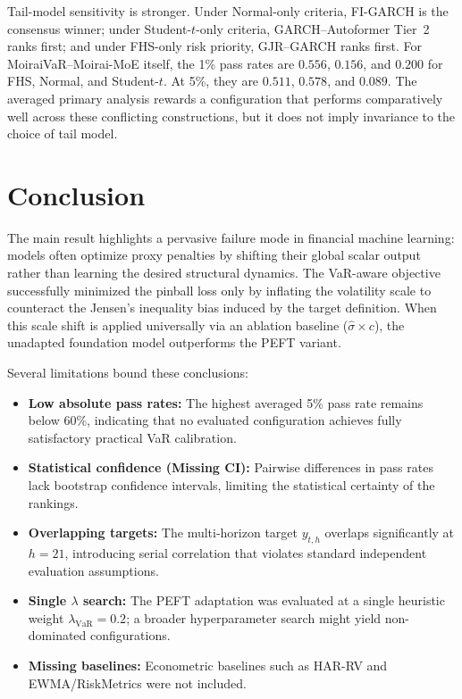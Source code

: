 \documentclass[runningheads]{llncs}
\begin{document}
Tail-model sensitivity is stronger. Under Normal-only criteria, FI-GARCH is
the consensus winner; under Student-\(t\)-only criteria,
GARCH--Autoformer Tier~2 ranks first; and under FHS-only risk priority,
GJR--GARCH ranks first. For MoiraiVaR--Moirai-MoE itself, the 1\% pass rates
are \(0.556\), \(0.156\), and \(0.200\) for FHS, Normal, and Student-\(t\).
At 5\%, they are \(0.511\), \(0.578\), and \(0.089\). The averaged primary
analysis rewards a configuration that performs comparatively well across
these conflicting constructions, but it does not imply invariance to the
choice of tail model.

\section{Conclusion}

The main result highlights a pervasive failure mode in financial machine learning: models often optimize proxy penalties by shifting their global scalar output rather than learning the desired structural dynamics. The VaR-aware objective successfully minimized the pinball loss only by inflating the volatility scale to counteract the Jensen's inequality bias induced by the target definition. When this scale shift is applied universally via an ablation baseline (\(\hat{\sigma} \times c\)), the unadapted foundation model outperforms the PEFT variant.

Several limitations bound these conclusions:
\begin{itemize}
\item \textbf{Low absolute pass rates:} The highest averaged 5\% pass rate remains
below 60\%, indicating that no evaluated configuration achieves fully satisfactory
practical VaR calibration.
\item \textbf{Statistical confidence (Missing CI):} Pairwise differences in pass rates lack bootstrap confidence intervals, limiting the statistical certainty of the rankings.
\item \textbf{Overlapping targets:} The multi-horizon target \(y_{t,h}\) overlaps significantly at \(h=21\), introducing serial correlation that violates standard independent evaluation assumptions.
\item \textbf{Single \(\lambda\) search:} The PEFT adaptation was evaluated at a single heuristic weight \(\lambda_{\mathrm{VaR}}=0.2\); a broader hyperparameter search might yield non-dominated configurations.
\item \textbf{Missing baselines:} Econometric baselines such as HAR-RV and EWMA/RiskMetrics \cite{morgan1996} were not included.
\end{itemize}
\end{document}
